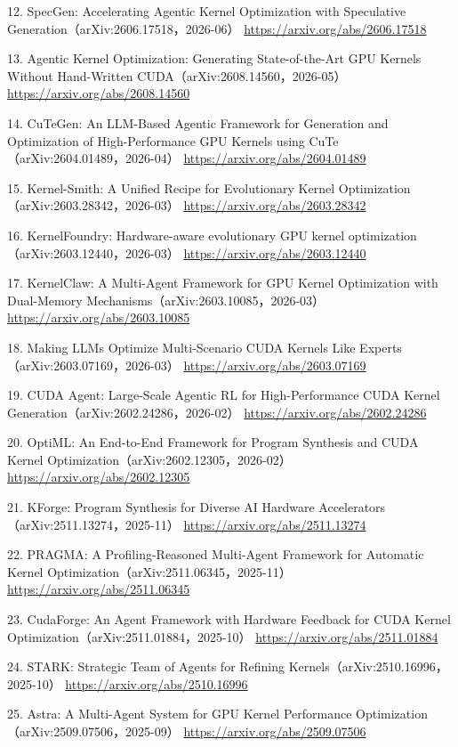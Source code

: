 \begin{refs}
12. SpecGen: Accelerating Agentic Kernel Optimization with Speculative Generation（arXiv:2606.17518，2026-06）  
   \url{https://arxiv.org/abs/2606.17518}

13. Agentic Kernel Optimization: Generating State-of-the-Art GPU Kernels Without Hand-Written CUDA（arXiv:2608.14560，2026-05）  
   \url{https://arxiv.org/abs/2608.14560}

14. CuTeGen: An LLM-Based Agentic Framework for Generation and Optimization of High-Performance GPU Kernels using CuTe（arXiv:2604.01489，2026-04）  
   \url{https://arxiv.org/abs/2604.01489}

15. Kernel-Smith: A Unified Recipe for Evolutionary Kernel Optimization（arXiv:2603.28342，2026-03）  
   \url{https://arxiv.org/abs/2603.28342}

16. KernelFoundry: Hardware-aware evolutionary GPU kernel optimization（arXiv:2603.12440，2026-03）  
   \url{https://arxiv.org/abs/2603.12440}

17. KernelClaw: A Multi-Agent Framework for GPU Kernel Optimization with Dual-Memory Mechanisms（arXiv:2603.10085，2026-03）  
   \url{https://arxiv.org/abs/2603.10085}

18. Making LLMs Optimize Multi-Scenario CUDA Kernels Like Experts（arXiv:2603.07169，2026-03）  
   \url{https://arxiv.org/abs/2603.07169}

19. CUDA Agent: Large-Scale Agentic RL for High-Performance CUDA Kernel Generation（arXiv:2602.24286，2026-02）  
   \url{https://arxiv.org/abs/2602.24286}

20. OptiML: An End-to-End Framework for Program Synthesis and CUDA Kernel Optimization（arXiv:2602.12305，2026-02）  
   \url{https://arxiv.org/abs/2602.12305}

21. KForge: Program Synthesis for Diverse AI Hardware Accelerators（arXiv:2511.13274，2025-11）  
   \url{https://arxiv.org/abs/2511.13274}

22. PRAGMA: A Profiling-Reasoned Multi-Agent Framework for Automatic Kernel Optimization（arXiv:2511.06345，2025-11）  
   \url{https://arxiv.org/abs/2511.06345}

23. CudaForge: An Agent Framework with Hardware Feedback for CUDA Kernel Optimization（arXiv:2511.01884，2025-10）  
   \url{https://arxiv.org/abs/2511.01884}

24. STARK: Strategic Team of Agents for Refining Kernels（arXiv:2510.16996，2025-10）  
   \url{https://arxiv.org/abs/2510.16996}

25. Astra: A Multi-Agent System for GPU Kernel Performance Optimization（arXiv:2509.07506，2025-09）  
   \url{https://arxiv.org/abs/2509.07506}


\end{refs}
